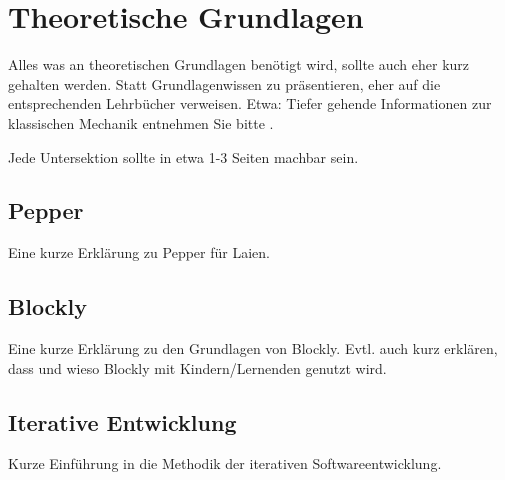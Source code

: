 \chapter{Theoretische Grundlagen}

Alles was an theoretischen Grundlagen benötigt wird, sollte auch eher kurz gehalten werden.
Statt Grundlagenwissen zu präsentieren, eher auf die entsprechenden Lehrbücher verweisen.
Etwa: Tiefer gehende Informationen zur klassischen Mechanik entnehmen Sie bitte \cite{kuypers}.

Jede Untersektion sollte in etwa 1-3 Seiten machbar sein.

\section{Pepper}
Eine kurze Erklärung zu Pepper für Laien.

\section{Blockly}
Eine kurze Erklärung zu den Grundlagen von Blockly.
Evtl. auch kurz erklären, dass und wieso Blockly mit Kindern/Lernenden genutzt wird.

\section{Iterative Entwicklung}
Kurze Einführung in die Methodik der iterativen Softwareentwicklung.